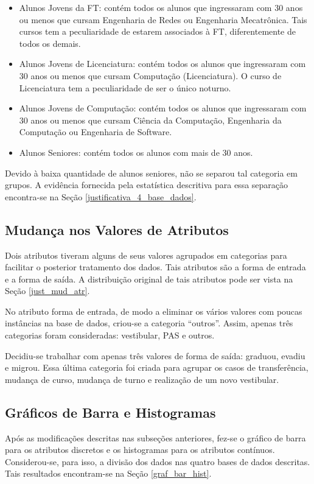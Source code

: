 \begin{itemize}
    \item Alunos Jovens da FT: contém todos os alunos que ingressaram com 30
        anos ou menos que cursam Engenharia de Redes ou Engenharia Mecatrônica. Tais
        cursos tem a peculiaridade de estarem associados à FT, 
        diferentemente de todos os demais.  
    \item Alunos Jovens de Licenciatura: contém todos os alunos que ingressaram com
        30 anos ou menos que cursam Computação (Licenciatura). O curso de
        Licenciatura tem a peculiaridade de ser o único noturno. 
    \item Alunos Jovens de Computação: contém todos os alunos que ingressaram com 30
        anos ou menos que cursam Ciência da Computação, Engenharia da Computação ou
        Engenharia de Software. 
    \item Alunos Seniores: contém todos os alunos com mais de 30 anos.
\end{itemize}
Devido à baixa quantidade de alunos seniores, não se separou tal categoria em grupos.
A evidência fornecida pela estatística descritiva para essa separação
encontra-se na Seção \ref{justificativa_4_base_dados}.

\subsection{Mudança nos Valores de Atributos}
\par Dois atributos tiveram alguns de seus valores agrupados em categorias para
facilitar o posterior tratamento dos dados. Tais atributos são a forma de entrada e a
forma de saída. A distribuição original de tais atributos pode ser vista na Seção 
\ref{just_mud_atr}. 
\par No atributo forma de entrada, de modo a eliminar os vários valores com poucas
instâncias na base de dados, criou-se a categoria ``outros''. Assim, apenas três 
categorias foram consideradas: vestibular, PAS e outros. 
\par Decidiu-se trabalhar com apenas três valores de forma de saída: graduou, evadiu
e migrou. Essa última categoria foi criada para agrupar os casos de transferência,
mudança de curso, mudança de turno e realização de um novo vestibular. 

\subsection{Gráficos de Barra e Histogramas}
Após as modificações descritas nas subseções anteriores, fez-se o gráfico de barra
para os atributos discretos e os histogramas para os atributos contínuos.
Considerou-se, para isso, a divisão dos dados nas quatro bases de dados descritas. Tais
resultados encontram-se na Seção \ref{graf_bar_hist}.

